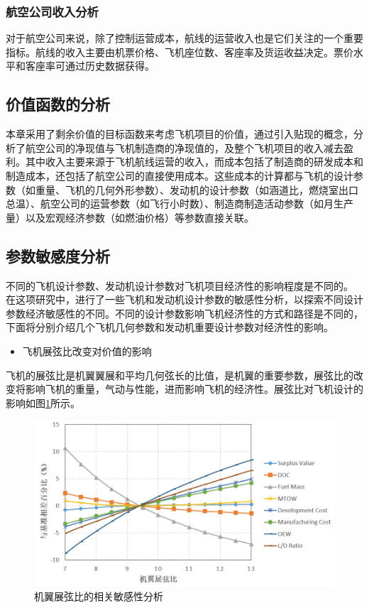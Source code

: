 \documentclass[12pt,a4paper]{report}
\begin{document}
\subsubsection{航空公司收入分析}
对于航空公司来说，除了控制运营成本，航线的运营收入也是它们关注的一个重要指标。航线的收入主要由机票价格、飞机座位数、客座率及货运收益决定。票价水平和客座率可通过历史数据获得。


\subsection{价值函数的分析}
本章采用了剩余价值的目标函数来考虑飞机项目的价值，通过引入贴现的概念，分析了航空公司的净现值与飞机制造商的净现值的，及整个飞机项目的收入减去盈利。其中收入主要来源于飞机航线运营的收入，而成本包括了制造商的研发成本和制造成本，还包括了航空公司的直接使用成本。这些成本的计算都与飞机的设计参数（如重量、飞机的几何外形参数）、发动机的设计参数（如涵道比，燃烧室出口总温）、航空公司的运营参数（如飞行小时数）、制造商制造活动参数（如月生产量）以及宏观经济参数（如燃油价格）等参数直接关联。

\subsection{参数敏感度分析}
 不同的飞机设计参数、发动机设计参数对飞机项目经济性的影响程度是不同的。 在这项研究中，进行了一些飞机和发动机设计参数的敏感性分析，以探索不同设计参数经济敏感性的不同。不同的设计参数影响飞机经济性的方式和路径是不同的，下面将分别介绍几个飞机几何参数和发动机重要设计参数对经济性的影响。
  \begin{itemize}
    \item[(1)] 飞机展弦比改变对价值的影响
\end{itemize}

飞机的展弦比是机翼翼展和平均几何弦长的比值，是机翼的重要参数，展弦比的改变将影响飞机的重量，气动与性能，进而影响飞机的经济性。展弦比对飞机设计的影响如图\ref{fig:ARsens}所示。
 \begin{figure}[!htp]
  \centering
  \includegraphics[width=.9\textwidth]{eps/SVvsAspectRatio.jpg}
  \caption{机翼展弦比的相关敏感性分析}
 \label{fig:ARsens}
\end{figure}
\end{document}
